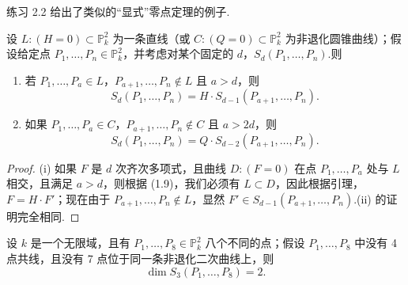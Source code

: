 练习 2.2 给出了类似的“显式”零点定理的例子.

\begin{corollary}
设 \(L: (H=0) \subset \mathbb{P}^2_k\) 为一条直线（或 \(C: (Q=0) \subset \mathbb{P}^2_k\) 为非退化圆锥曲线）；假设给定点 \(P_1, \dots, P_n \in \mathbb{P}^2_k\)，并考虑对某个固定的 \(d\)，\(S_d(P_1, \dots, P_n)\).则
\begin{enumerate}
    \item[(i)] 若 \(P_1, \dots, P_a \in L\)，\(P_{a+1}, \dots, P_n \notin L\) 且 \(a > d\)，则
    \[
    S_d(P_1, \dots, P_n) = H \cdot S_{d-1}(P_{a+1}, \dots, P_n).
    \]
    \item[(ii)] 如果 \(P_1, \dots, P_a \in C\)，\(P_{a+1}, \dots, P_n \notin C\) 且 \(a > 2d\)，则
    \[
    S_d(P_1, \dots, P_n) = Q \cdot S_{d-2}(P_{a+1}, \dots, P_n).
    \]
\end{enumerate}
\end{corollary}

\begin{proof}
(i) 如果 \(F\) 是 \(d\) 次齐次多项式，且曲线 \(D: (F=0)\) 在点 \(P_1, \dots, P_a\) 处与 \(L\) 相交，且满足 \(a > d\)，则根据 (1.9)，我们必须有 \(L \subset D\)，因此根据引理，\(F = H \cdot F'\)；现在由于 \(P_{a+1}, \dots, P_n \notin L\)，显然 \(F' \in S_{d-1}(P_{a+1}, \dots, P_n)\).(ii) 的证明完全相同.
\end{proof}

\begin{proposition}
设 \(k\) 是一个无限域，且有 \(P_1, \dots, P_8 \in \mathbb{P}^2_k\) 八个不同的点；假设 \(P_1, \dots, P_8\) 中没有 4 点共线，且没有 7 点位于同一条非退化二次曲线上，则
\[
\dim S_3(P_1, \dots, P_8) = 2.
\]
\end{proposition}

